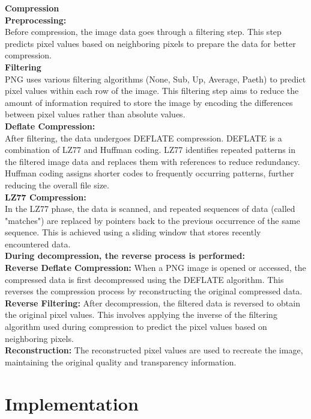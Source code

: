 \documentclass{report}
\begin{document}
\textbf{Compression}\\
\textbf{Preprocessing:}\\
Before compression, the image data goes through a filtering step. This step predicts pixel values based on neighboring pixels to prepare the data for better compression.\\
\textbf{Filtering}\\
PNG uses various filtering algorithms (None, Sub, Up, Average, Paeth) to predict pixel values within each row of the image. This filtering step aims to reduce the amount of information required to store the image by encoding the differences between pixel values rather than absolute values.\\
\textbf{Deflate Compression:}\\
After filtering, the data undergoes DEFLATE compression. DEFLATE is a combination of LZ77 and Huffman coding. LZ77 identifies repeated patterns in the filtered image data and replaces them with references to reduce redundancy. Huffman coding assigns shorter codes to frequently occurring patterns, further reducing the overall file size.\\
\textbf{LZ77 Compression:}\\
In the LZ77 phase, the data is scanned, and repeated sequences of data (called "matches") are replaced by pointers back to the previous occurrence of the same sequence. This is achieved using a sliding window that stores recently encountered data.\\

\textbf{\large During decompression, the reverse process is performed:}\\
\textbf{Reverse Deflate Compression: } When a PNG image is opened or accessed, the compressed data is first decompressed using the DEFLATE algorithm. This reverses the compression process by reconstructing the original compressed data.\\
\textbf{Reverse Filtering: } After decompression, the filtered data is reversed to obtain the original pixel values. This involves applying the inverse of the filtering algorithm used during compression to predict the pixel values based on neighboring pixels.\\
\textbf{Reconstruction:} The reconstructed pixel values are used to recreate the image, maintaining the original quality and transparency information.\\

\newpage
\chapter{Implementation}
\end{document}
